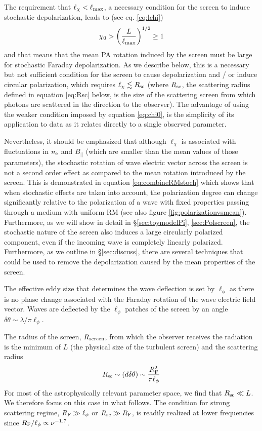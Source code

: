 \documentclass[fleqn,usenatbib]{mnras}
\begin{document}
	The requirement that $\ell_{\chi}<\ell_{\rm max}$, a necessary condition for the screen to induce stochastic depolarization, leads to (see eq. \ref{eq:lchi})
	\begin{equation}
		\label{eq:chi0}
		\chi_0>\left(\frac{L}{\ell_{\rm max}}\right)^{1/2}\geq 1%
	\end{equation}
	and that means that the mean PA rotation induced by the screen must be large for stochastic Faraday depolarization. As we describe below, this is a necessary but not sufficient condition for the screen to cause depolarization and / or induce circular polarization, which requires $\ell_{\chi}\lesssim R_{\rm sc}$ (where $R_{\rm sc}$, the scattering radius defined in equation \ref{eq:Rsc} below, is the size of the scattering screen from which photons are scattered in the direction to the observer). The advantage of using the weaker condition imposed by equation \ref{eq:chi0}, is the simplicity of its application to data as it relates directly to a single observed parameter. 
	
	Nevertheless, it should be emphasized that although $\ell_{\chi}$ is associated with fluctuations in $n_{\rm e}$ and $B_{||}$ (which are smaller than the mean values of those parameters), the stochastic rotation of wave electric vector across the screen is not a second order effect as compared to the mean rotation introduced by the screen. This is demonstrated in equation \ref{eq:combineRMstoch} which shows that when stochastic effects are taken into account, the polarization degree can change significantly relative to the polarization of a wave with fixed properties passing through a medium with uniform RM (see also figure \ref{fig:polarizationvsmean}). Furthermore, as we will show in detail in \S \ref{sec:toymodelPi}, \ref{sec:Polscreen}, the stochastic nature of the screen also induces a large circularly polarized component, even if the incoming wave is completely linearly polarized. 
	Furthermore, as we outline in \S \ref{sec:discuss}, there are several techniques that could be used to remove the depolarization caused by the mean properties of the screen.
	
	The effective eddy size that determines the wave deflection is set by $\ell_\phi$ as there is no phase change associated with the Faraday rotation of the wave electric field vector. Waves are deflected by the $\ell_{\phi}$ patches of the screen by an angle $\delta\theta \sim \lambda/\pi\ell_{\phi}$.
	
	The radius of the screen, $R_{\rm screen}$, from which the observer receives the radiation is the minimum of $L$ (the physical size of the turbulent screen) and the scattering radius
	\begin{equation}
		\label{eq:Rsc}
		R_{\rm sc} \sim (d\delta\theta)\sim \frac{R_{\rm F}^2}{\pi\ell_{\phi}}
	\end{equation}
	For most of the astrophysically relevant parameter space, we find that $R_{\rm sc}\ll L$. We therefore focus on this case in what follows. The condition for strong scattering regime, $R_{\rm F}\gg \ell_{\phi}$ or $R_{\rm sc}\gg R_{\rm F}$, is readily realized at lower frequencies since $R_{\rm F}/\ell_{\phi}\propto \nu^{-1.7}$.
	
\end{document}
